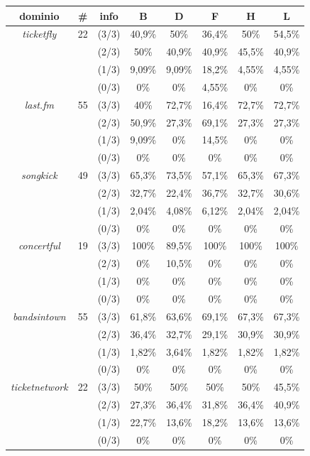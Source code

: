 \documentclass[a4paper]{report}
\begin{document}
\begin{center}
\begin{tabular}{|cccccccc|}
\hline
dominio & \# & info & B & D & F & H & L \\
\hline
\textit{ticketfly} &22& (3/3) & 40,9\%& 50\%& 36,4\%& 50\%& 54,5\% \\
& & (2/3) & 50\%& 40,9\%& 40,9\%& 45,5\%& 40,9\% \\
& & (1/3) & 9,09\%& 9,09\%& 18,2\%& 4,55\%& 4,55\% \\
& & (0/3) & 0\%& 0\%& 4,55\%& 0\%& 0\% \\
\hline
\textit{last.fm} &55& (3/3) & 40\%& 72,7\%& 16,4\%& 72,7\%& 72,7\% \\
& & (2/3) & 50,9\%& 27,3\%& 69,1\%& 27,3\%& 27,3\% \\
& & (1/3) & 9,09\%& 0\%& 14,5\%& 0\%& 0\% \\
& & (0/3) & 0\%& 0\%& 0\%& 0\%& 0\% \\
\hline
\textit{songkick} &49& (3/3) & 65,3\%& 73,5\%& 57,1\%& 65,3\%& 67,3\% \\
& & (2/3) & 32,7\%& 22,4\%& 36,7\%& 32,7\%& 30,6\% \\
& & (1/3) & 2,04\%& 4,08\%& 6,12\%& 2,04\%& 2,04\% \\
& & (0/3) & 0\%& 0\%& 0\%& 0\%& 0\% \\
\hline
\textit{concertful} &19& (3/3) & 100\%& 89,5\%& 100\%& 100\%& 100\% \\
& & (2/3) & 0\%& 10,5\%& 0\%& 0\%& 0\% \\
& & (1/3) & 0\%& 0\%& 0\%& 0\%& 0\% \\
& & (0/3) & 0\%& 0\%& 0\%& 0\%& 0\% \\
\hline
\textit{bandsintown} &55& (3/3) & 61,8\%& 63,6\%& 69,1\%& 67,3\%& 67,3\% \\
& & (2/3) & 36,4\%& 32,7\%& 29,1\%& 30,9\%& 30,9\% \\
& & (1/3) & 1,82\%& 3,64\%& 1,82\%& 1,82\%& 1,82\% \\
& & (0/3) & 0\%& 0\%& 0\%& 0\%& 0\% \\
\hline
\textit{ticketnetwork} &22& (3/3) & 50\%& 50\%& 50\%& 50\%& 45,5\% \\
& & (2/3) & 27,3\%& 36,4\%& 31,8\%& 36,4\%& 40,9\% \\
& & (1/3) & 22,7\%& 13,6\%& 18,2\%& 13,6\%& 13,6\% \\
& & (0/3) & 0\%& 0\%& 0\%& 0\%& 0\% \\
\hline
\end{tabular}
\end{center}
\end{document}

